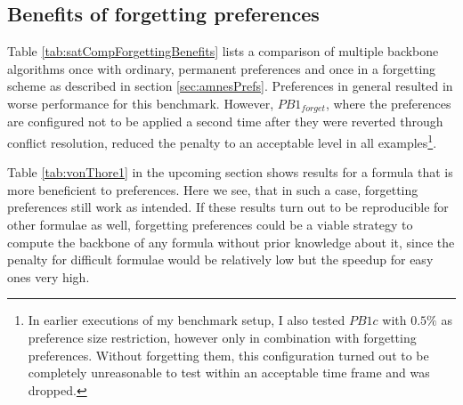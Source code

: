 \subsection{Benefits of forgetting preferences}
Table \ref{tab:satCompForgettingBenefits}
lists a comparison of multiple backbone algorithms once with ordinary, permanent preferences and once in a forgetting scheme as described in section \ref{sec:amnesPrefs}. Preferences in general resulted in worse performance for this benchmark. However, $PB1_{forget}$, where the preferences are configured not to be applied a second time after they were reverted through conflict resolution, reduced the penalty to an acceptable level in all examples\footnote{
	In earlier executions of my benchmark setup, I also tested $PB1c$ with $0.5\%$ as preference size restriction, however only in combination with forgetting preferences. Without forgetting them, this configuration turned out to be completely unreasonable to test within an acceptable time frame and was dropped.}.


Table \ref{tab:vonThore1} in the upcoming section shows results for a formula that is more beneficient to preferences. Here we see, that in such a case, forgetting preferences still work as intended. If these results turn out to be reproducible for other formulae as well, forgetting preferences could be a viable strategy to compute the backbone of any formula without prior knowledge about it, since the penalty for difficult formulae would be relatively low but the speedup for easy ones very high.


